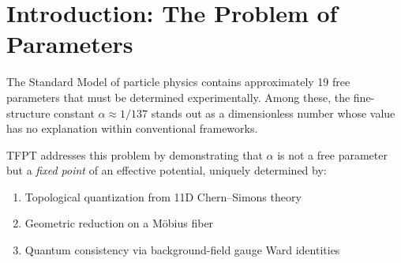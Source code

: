 \tableofcontents
\section{Introduction: The Problem of Parameters}

The Standard Model of particle physics contains approximately 19 free parameters 
that must be determined experimentally. Among these, the fine-structure constant 
$\alpha \approx 1/137$ stands out as a dimensionless number whose value has no 
explanation within conventional frameworks.

TFPT addresses this problem by demonstrating that $\alpha$ is not a free parameter 
but a \emph{fixed point} of an effective potential, uniquely determined by:
\begin{enumerate}[label=(\roman*)]
    \item Topological quantization from 11D Chern--Simons theory
    \item Geometric reduction on a M\"obius fiber
    \item Quantum consistency via background-field gauge Ward identities
\end{enumerate}

